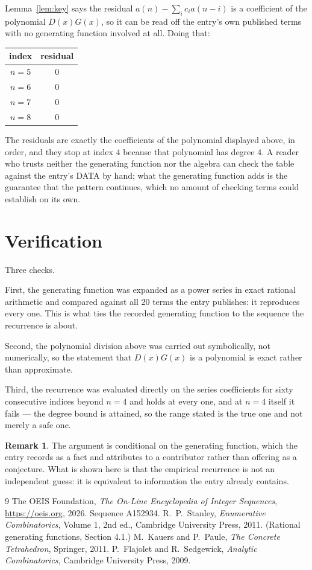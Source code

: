 \documentclass[11pt,a4paper]{article}
\theoremstyle{plain}
\theoremstyle{definition}
\newtheorem{remark}[theorem]{Remark}
\begin{document}
Lemma~\ref{lem:key} says the residual $a(n)-\sum_ic_ia(n-i)$ is a coefficient of the
polynomial $D(x)G(x)$, so it can be read off the entry's own published terms with no
generating function involved at all. Doing that:
\begin{center}
\begin{tabular}{cc}
index & residual \\ \hline
$n=5$ & $0$ \\
$n=6$ & $0$ \\
$n=7$ & $0$ \\
$n=8$ & $0$
\end{tabular}
\end{center}
The residuals are exactly the coefficients of the polynomial displayed above, in order, and
they stop at index $4$ because that polynomial has degree $4$. A reader who trusts
neither the generating function nor the algebra can check the table against the entry's DATA
by hand; what the generating function adds is the guarantee that the pattern continues, which
no amount of checking terms could establish on its own.

\section{Verification}

Three checks.

First, the generating function was expanded as a power series in exact rational arithmetic and
compared against all $20$ terms the entry publishes: it reproduces every one. This is
what ties the recorded generating function to the sequence the recurrence is about.

Second, the polynomial division above was carried out symbolically, not numerically, so the
statement that $D(x)G(x)$ is a polynomial is exact rather than approximate.

Third, the recurrence was evaluated directly on the series coefficients for sixty consecutive
indices beyond $n=4$ and holds at every one, and at $n=4$ itself it fails --- the
degree bound is attained, so the range stated is the true one and not merely a safe one.

\begin{remark}
The argument is conditional on the generating function, which the entry records as a fact and
attributes to a contributor rather than offering as a conjecture. What is shown here is that
the empirical recurrence is not an independent guess: it is equivalent to information the
entry already contains.
\end{remark}

\begin{thebibliography}{9}
 The OEIS Foundation, \emph{The On-Line Encyclopedia of Integer
Sequences}, \url{https://oeis.org}, 2026. Sequence A152934.
 R.~P.~Stanley, \emph{Enumerative Combinatorics}, Volume 1, 2nd ed.,
Cambridge University Press, 2011. (Rational generating functions, Section 4.1.)
 M.~Kauers and P.~Paule, \emph{The Concrete Tetrahedron}, Springer, 2011.
 P.~Flajolet and R.~Sedgewick, \emph{Analytic Combinatorics}, Cambridge
University Press, 2009.
\end{thebibliography}
\end{document}
